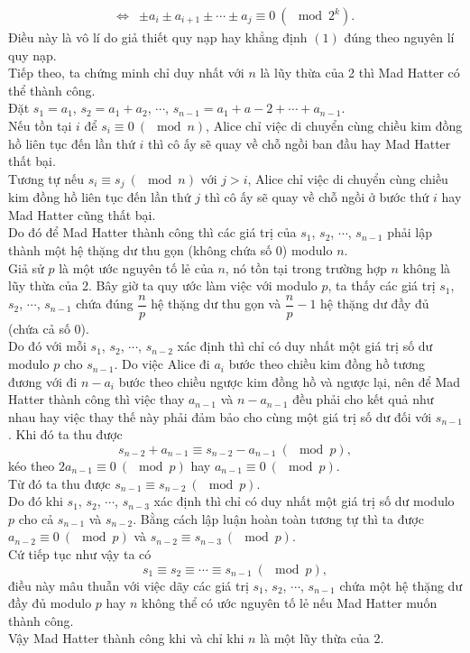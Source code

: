 \begin{ex}
{\begin{align*}
		\Leftrightarrow &\pm a_i\pm a_{i+1}\pm \cdots \pm a_j\equiv 0\ (\mod 2^k).
	\end{align*}
Điều này là vô lí do giả thiết quy nạp hay khẳng định $(1)$ đúng theo nguyên lí quy nạp.\\
Tiếp theo, ta chứng minh chỉ duy nhất với $n$ là lũy thừa của 2 thì Mad Hatter có thể thành công.\\
Đặt $s_1=a_1$, $s_2=a_1+a_2$, $\cdots$, $s_{n-1}=a_1+a-2+\cdots+a_{n-1}$.\\
Nếu tồn tại $i$ để $s_i\equiv 0\ (\mod n)$, Alice chỉ việc di chuyển cùng chiều kim đồng hồ liên tục đến lần thứ $i$ thì cô ấy sẽ quay về chỗ ngồi ban đầu hay Mad Hatter thất bại.\\
Tương tự nếu $s_i\equiv s_j\ (\mod n)$ với $j>i$, Alice chỉ việc di chuyển cùng chiều kim đồng hồ liên tục đến lần thứ $j$ thì cô ấy sẽ quay về chỗ ngồi ở bước thứ $i$ hay Mad Hatter cũng thất bại.\\
Do đó để Mad Hatter thành công thì các giá trị của $s_1$, $s_2$, $\cdots$, $s_{n-1}$ phải lập thành một hệ thặng dư thu gọn (không chứa số 0) modulo $n$.\\
Giả sử $p$ là một ước nguyên tố lẻ của $n$, nó tồn tại trong trường hợp $n$ không là lũy thừa của 2. Bây giờ ta quy ước làm việc với modulo $p$, ta thấy các giá trị $s_1$, $s_2$, $\cdots$, $s_{n-1}$ chứa đúng $\dfrac{n}{p}$ hệ thặng dư thu gọn và $\dfrac{n}{p}-1$ hệ thặng dư đầy đủ (chứa cả số 0).\\
Do đó với mỗi $s_1$, $s_2$, $\cdots$, $s_{n-2}$ xác định thì chỉ có duy nhất một giá trị số dư modulo $p$ cho $s_{n-1}$. Do việc Alice đi $a_i$ bước theo chiều kim đồng hồ tương đương với đi $n-a_i$ bước theo chiều ngược kim đồng hồ và ngược lại, nên để Mad Hatter thành công thì việc thay $a_{n-1}$ và $n-a_{n-1}$ đều phải cho kết quả như nhau hay việc thay thế này phải đảm bảo cho cùng một giá trị số dư đối với $s_{n-1}$. Khi đó ta thu được $$s_{n-2}+a_{n-1}\equiv s_{n-2}-a_{n-1}\ (\mod p),$$
kéo theo $2a_{n-1}\equiv 0\ (\mod p)$ hay $a_{n-1}\equiv 0\ (\mod p)$.\\
Từ đó ta thu được $s_{n-1}\equiv s_{n-2}\ (\mod p)$.\\
Do đó khi $s_1$, $s_2$, $\cdots$, $s_{n-3}$ xác định thì chỉ có duy nhất một giá trị số dư modulo $p$ cho cả $s_{n-1}$ và $s_{n-2}$. Bằng cách lập luận hoàn toàn tương tự thì ta được $a_{n-2}\equiv 0\ (\mod p)$ và $s_{n-2}\equiv s_{n-3}\ (\mod p)$.\\
Cứ tiếp tục như vậy ta có
$$s_1\equiv s_2\equiv\cdots\equiv s_{n-1}\ (\mod p),$$
điều này mâu thuẫn với việc dãy các giá trị $s_1$, $s_2$, $\cdots$, $s_{n-1}$ chứa một hệ thặng dư đầy đủ modulo $p$ hay $n$ không thể có ước nguyên tố lẻ nếu Mad Hatter muốn thành công.\\
Vậy Mad Hatter thành công khi và chỉ khi $n$ là một lũy thừa của 2.  
}
\end{ex}

